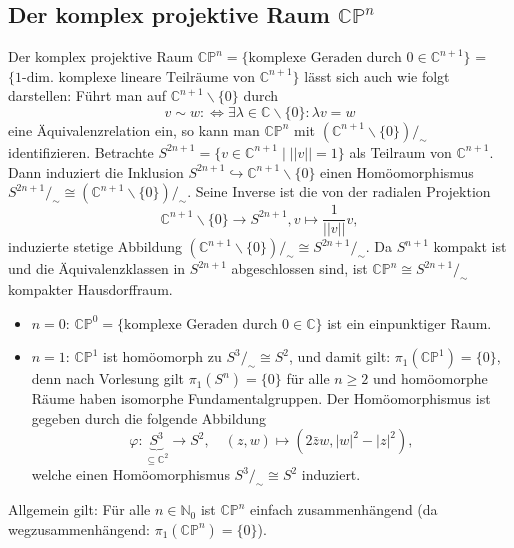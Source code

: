 \documentclass[a4paper,11pt,notitlepage]{report}
\newcommand{\N}{{\ensuremath{\mathbb{N}}}}
\newcommand{\C}{{\ensuremath{\mathbb{C}}}}
\newcommand{\Prim}{{\ensuremath{\mathbb{P}}}}
\begin{document}
\subsection{Der komplex projektive Raum $\C \Prim^n$}
	Der komplex projektive Raum $\C \Prim^n = \{\text{komplexe Geraden durch } 0 \in \C^{n+1}\}$ = $\{\text{1-dim. komplexe lineare Teilräume von } \C^{n+1}\}$ lässt sich auch wie folgt darstellen:
	\newline
	Führt man auf $\C^{n+1} \backslash \{0\}$ durch 
	$$v \sim w :\Leftrightarrow \exists \lambda \in \C \backslash \{0\} \colon \lambda v = w$$
	eine Äquivalenzrelation ein, so kann man $\C \Prim^n$ mit $(\C^{n+1} \backslash \{0\})/_\sim$ identifizieren.
	\newline
	Betrachte $S^{2n+1} = \{v \in \C^{n+1} \mid || v || = 1\}$ als Teilraum von $\C^{n+1}$. Dann induziert die Inklusion $S^{2n+1} \hookrightarrow \C^{n+1} \backslash \{0\}$ einen Homöomorphismus $S^{2n+1} /_\sim \cong (\C^{n+1} \backslash \{0\}) /_\sim$.
	\newline
	Seine Inverse ist die von der radialen Projektion $$\C^{n+1} \backslash \{0\} \rightarrow S^{2n+1}, v \mapsto \frac{1}{||v||} v,$$ induzierte stetige Abbildung $(\C^{n+1} \backslash \{0\})/_\sim \cong S^{2n+1} /_\sim$. 
	\newline
	Da $S^{n+1}$ kompakt ist und die Äquivalenzklassen in $S^{2n+1}$ abgeschlossen sind, ist $\C \Prim^n \cong S^{2n+1} /_\sim$ kompakter Hausdorffraum.  
	\begin{itemize}
		\item \underline{$n = 0$}: $\C \Prim^0 = \{\text{komplexe Geraden durch } 0 \in \C\}$ ist ein einpunktiger Raum.
		\item \underline{$n=1$}: $\C \Prim^1$ ist homöomorph zu $S^3 /_\sim \cong S^2$, und damit gilt: \newline $\pi_1(\C \Prim^1) = \{0\}$, denn nach Vorlesung gilt $\pi_1(S^n) = \{0\}$ für alle $n \geq 2$ und homöomorphe Räume haben isomorphe Fundamentalgruppen.
		\newline
		Der Homöomorphismus ist gegeben durch die folgende Abbildung
		$$\varphi \colon \underbrace{S^3}_{\subseteq \C^2} \rightarrow S^2, \quad (z,w) \mapsto (2 \bar{z} w, |w|^2 - |z|^2),$$
		welche einen Homöomorphismus $S^3 /_\sim \cong S^2$ induziert.
	\end{itemize}

Allgemein gilt: Für alle $n \in \N_0$ ist $\C \Prim^n$ einfach zusammenhängend (da wegzusammenhängend: $\pi_1(\C \Prim^n) = \{0\}$).
\end{document}
